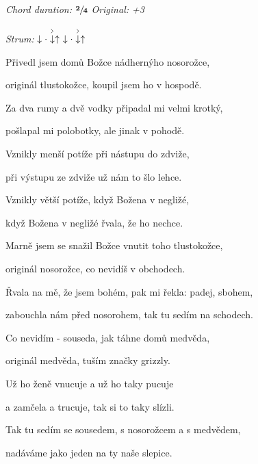\begin{song}



\textit{Chord duration: $\mathbf{\sfrac{2}{4}}$} \quad
\textit{Original: +3}

\textit{Strum:} $\Down\Miss\AccentDown\Up\ \Down\Miss\AccentDown\Up$

\Large


\bigskip

Přivedl jsem domů Božce nádhernýho nosorožce, \par
{}originál tlustokožce, koupil jsem ho v hospodě. \par
{}Za dva rumy a dvě vodky připadal mi velmi krotký, \par
{}pošlapal mi polobotky, ale jinak v pohodě. \par

\bigskip

Vznikly menší potíže při nástupu do zdviže, \par
{}při výstupu ze zdviže už nám to šlo lehce. \par
{}Vznikly větší potíže, když Božena v negližé, \par
{}když Božena v negližé řvala, že ho nechce. \par

\bigskip

Marně jsem se snažil Božce vnutit toho tlustokožce, \par
{}originál nosorožce, co nevidíš v obchodech. \par
{}Řvala na mě, že jsem bohém, pak mi řekla: padej, sbohem, \par
{}zabouchla nám před nosorohem, tak tu sedím na schodech. \par

\bigskip

Co nevidím - souseda, jak táhne domů medvěda, \par
{}originál medvěda, tuším značky grizzly. \par
{}Už ho ženě vnucuje a už ho taky pucuje \par
a zamčela a trucuje, tak si to taky slízli. \par

\bigskip

Tak tu sedím se sousedem, s nosorožcem a s medvědem, \par
{}nadáváme jako jeden na ty naše slepice. \par

\end{song}
